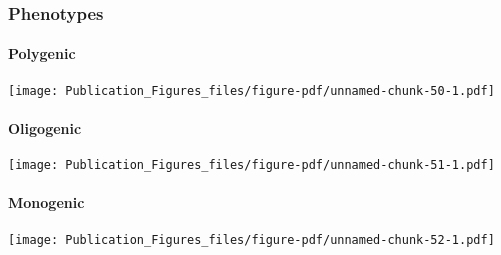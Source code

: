 \documentclass[
  letterpaper,
  DIV=11,
  numbers=noendperiod]{scrartcl}
\begin{document}
\hypertarget{phenotypes-3}{%
\subsubsection{Phenotypes}\label{phenotypes-3}}

\hypertarget{polygenic-6}{%
\paragraph{Polygenic}\label{polygenic-6}}

\texttt{[image: Publication\_Figures\_files/figure-pdf/unnamed-chunk-50-1.pdf]}

\hypertarget{oligogenic-6}{%
\paragraph{Oligogenic}\label{oligogenic-6}}

\texttt{[image: Publication\_Figures\_files/figure-pdf/unnamed-chunk-51-1.pdf]}

\hypertarget{monogenic-6}{%
\paragraph{Monogenic}\label{monogenic-6}}

\texttt{[image: Publication\_Figures\_files/figure-pdf/unnamed-chunk-52-1.pdf]}
\end{document}
